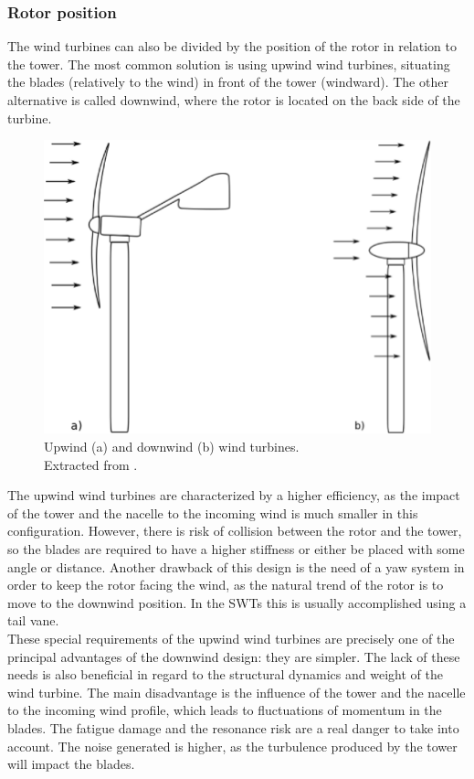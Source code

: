 \documentclass[../TFG_Report.tex]{subfiles}
\begin{document}
\subsubsection*{Rotor position}

The wind turbines can also be divided by the position of the rotor in relation to the tower. The most common solution is using upwind wind turbines, situating the blades (relatively to the wind) in front of the tower (windward). The other alternative is called downwind, where the rotor is located on the back side of the turbine. \\

\begin{figure}[h!]
	\centering
	\includegraphics[width=0.4\linewidth]{Images/Upwind-a-and-downwind-b-wind-turbines}
	\caption[Upwind and downwind wind turbines]{Upwind (a) and downwind (b) wind turbines. \\ Extracted from \cite{DesignControl}.}
	\label{fig:upwind-a-and-downwind-b-wind-turbines}
\end{figure}


The upwind wind turbines are characterized by a higher efficiency, as the impact of the tower and the nacelle to the incoming wind is much smaller in this configuration. However, there is risk of collision between the rotor and the tower, so the blades are required to have a higher stiffness or either be placed with some angle or distance. Another drawback of this design is the need of a yaw system in order to keep the rotor facing the wind, as the natural trend of the rotor is to move to the downwind position. In the SWTs this is usually accomplished using a tail vane.   \\

These special requirements of the upwind wind turbines are precisely one of the principal advantages of the downwind design: they are simpler. The lack of these needs is also beneficial in regard to the structural dynamics and weight of the wind turbine. The main disadvantage is the influence of the tower and the nacelle to the incoming wind profile, which leads to fluctuations of momentum in the blades. The fatigue damage and the resonance risk are a real danger to take into account. The noise generated is higher, as the turbulence produced by the tower will impact the blades. \cite{DesignControl}
\end{document}
